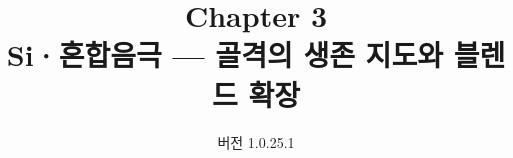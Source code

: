


\renewcommand{\theequation}{3.\arabic{equation}}
\renewcommand{\thesection}{3.\arabic{section}}

\title{\textbf{\LARGE Chapter 3}\\[0.35em]\Large Si·혼합음극 --- 골격의 생존 지도와 블렌드 확장}
\author{}
\date{\normalsize 버전 1.0.25.1}


\maketitle







\appendix



